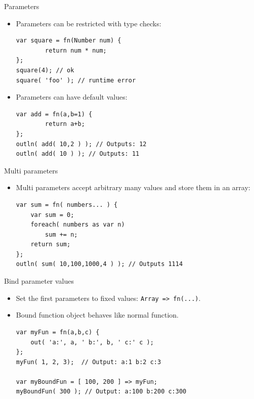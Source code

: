 \documentclass[ucs,9pt]{beamer}
\begin{document}
\begin{frame}[fragile]{Parameters}
	\begin{itemize}
	\item Parameters can be restricted with type checks:
		\begin{lstlisting}
var square = fn(Number num) {
		return num * num;
};
square(4); // ok
square( 'foo' ); // runtime error
		\end{lstlisting}
	\pause
	\item Parameters can have default values:
		\begin{lstlisting}
var add = fn(a,b=1) {
		return a+b;
};
outln( add( 10,2 ) ); // Outputs: 12
outln( add( 10 ) ); // Outputs: 11
		\end{lstlisting}
	\end{itemize}
\end{frame}

\begin{frame}[fragile]{Multi parameters}
	\begin{itemize}
	\item Multi parameters accept arbitrary many values and store them in an array:
		\begin{lstlisting}
var sum = fn( numbers... ) {
	var sum = 0;
	foreach( numbers as var n)
		sum += n;
	return sum;
};
outln( sum( 10,100,1000,4 ) ); // Outputs 1114
		\end{lstlisting}
		\end{itemize}
\end{frame}


\begin{frame}[fragile]{Bind parameter values}
	\begin{itemize}
	\item Set the first parameters to fixed values: \lstinline!Array => fn(...)!.
	\item Bound function object behaves like normal function.
		\begin{lstlisting}
var myFun = fn(a,b,c) {
    out( 'a:', a, ' b:', b, ' c:' c );
};
myFun( 1, 2, 3);  // Output: a:1 b:2 c:3

var myBoundFun = [ 100, 200 ] => myFun;
myBoundFun( 300 ); // Output: a:100 b:200 c:300
		\end{lstlisting}
		\end{itemize}
\end{frame}
\end{document}
